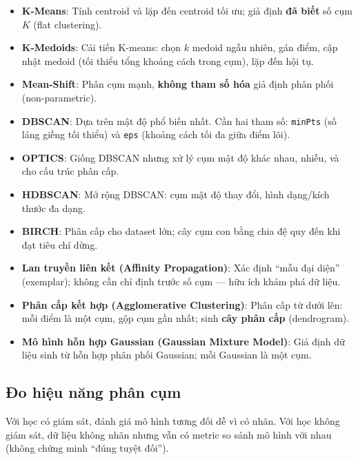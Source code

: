 \begin{phuongphap}[title={Danh sách}]
  \begin{itemize}
    \item \textbf{K-Means}: Tính centroid và lặp đến centroid tối ưu; giả định \textbf{đã biết} số cụm $K$ (flat clustering).
    \item \textbf{K-Medoids}: Cải tiến K-means: chọn $k$ medoid ngẫu nhiên, gán điểm, cập nhật medoid (tối thiểu tổng khoảng cách trong cụm), lặp đến hội tụ.
    \item \textbf{Mean-Shift}: Phân cụm mạnh, \textbf{không tham số hóa} giả định phân phối (non-parametric).
    \item \textbf{DBSCAN}: Dựa trên mật độ phổ biến nhất. Cần hai tham số: \texttt{minPts} (số láng giềng tối thiểu) và \texttt{eps} (khoảng cách tối đa giữa điểm lõi).
    \item \textbf{OPTICS}: Giống DBSCAN nhưng xử lý cụm mật độ khác nhau, nhiễu, và cho cấu trúc phân cấp.
    \item \textbf{HDBSCAN}: Mở rộng DBSCAN: cụm mật độ thay đổi, hình dạng/kích thước đa dạng.
    \item \textbf{BIRCH}: Phân cấp cho dataset lớn; cây cụm con bằng chia đệ quy đến khi đạt tiêu chí dừng.
    \item \textbf{Lan truyền liên kết (Affinity Propagation)}: Xác định ``mẫu đại diện'' (exemplar); không cần chỉ định trước số cụm --- hữu ích khám phá dữ liệu.
    \item \textbf{Phân cấp kết hợp (Agglomerative Clustering)}: Phân cấp từ dưới lên: mỗi điểm là một cụm, gộp cụm gần nhất; sinh \textbf{cây phân cấp} (dendrogram).
    \item \textbf{Mô hình hỗn hợp Gaussian (Gaussian Mixture Model)}: Giả định dữ liệu sinh từ hỗn hợp phân phối Gaussian; mỗi Gaussian là một cụm.
  \end{itemize}
\end{phuongphap}

\subsection{Đo hiệu năng phân cụm}

\begin{dongco}[title={Bối cảnh}]
Với học có giám sát, đánh giá mô hình tương đối dễ vì có nhãn.
Với học không giám sát, dữ liệu không nhãn nhưng vẫn có metric so sánh mô hình với nhau (không chứng minh ``đúng tuyệt đối'').
\end{dongco}

